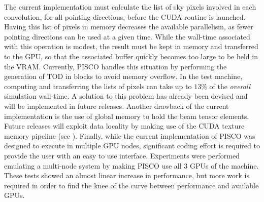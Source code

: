 \documentclass[a4paper,11pt]{article}
\begin{document}
The current implementation must calculate the list of sky pixels involved in each convolution, for all pointing directions, before the CUDA routine is launched. Having this list of pixels in memory decreases the available parallelism, as fewer pointing directions can be used at a given time. While the wall-time associated with this operation is modest, the result must be kept in memory and transferred to the GPU, so that the associated buffer quickly becomes too large to be held in the VRAM. Currently, PISCO handles this situation by performing the generation of TOD in blocks to avoid memory overflow. In the test machine, computing and transferring the lists of pixels can take up to $13\%$ of the \textsl{overall} simulation wall-time. A solution to this problem has already been devised and will be implemented in future releases. Another drawback of the current implementation is the use of global memory to hold the beam tensor elements. Future releases will exploit data locality by making use of the CUDA texture memory pipeline (see \cite{sanders2010cuda}). Finally, while the current implementation of PISCO was designed to execute in multiple GPU nodes, significant coding effort is required to provide the user with an easy to use interface. Experiments were performed emulating a multi-node system by making PISCO use all 3 GPUs of the machine. These tests showed an almost linear increase in performance, but more work is required in order to find the knee of the curve between performance and available GPUs.


\end{document}
